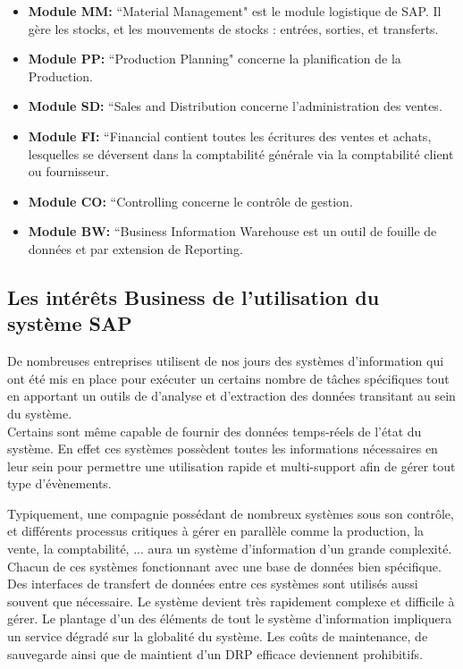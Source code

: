 \begin{itemize}
	\item \textbf{Module MM: }``Material Management" est le module logistique de SAP. Il gère les stocks, et les mouvements de stocks : entrées, sorties, et transferts.
	
	\item \textbf{Module PP: }``Production Planning" concerne la planification de la Production.
	
	 \item \textbf{Module SD: }``Sales and Distribution concerne l'administration des ventes.
	 
	 \item \textbf{Module FI: }``Financial contient toutes les écritures des ventes et achats, lesquelles se déversent dans la comptabilité générale via la comptabilité client ou fournisseur.
	 
	 \item \textbf{Module CO: }``Controlling concerne le contrôle de gestion.
	 
	 \item \textbf{Module BW: }``Business Information Warehouse est un outil de fouille de données et par extension de Reporting.
	 
\end{itemize} 

\clearpage

\subsection{Les intérêts Business de l'utilisation du système SAP}

De nombreuses entreprises utilisent de nos jours des systèmes d'information qui ont été mis en place pour exécuter un certains nombre de tâches spécifiques tout en apportant un outils de d'analyse et d'extraction des données transitant au sein du système.\\
Certains sont même capable de fournir des données temps-réels de l'état du système. En effet ces systèmes possèdent toutes les informations nécessaires en leur sein pour permettre une utilisation rapide et multi-support afin de gérer tout type d'évènements. 

Typiquement, une compagnie possédant de nombreux systèmes sous son contrôle, et différents processus critiques à gérer en parallèle comme la production, la vente, la comptabilité, ... aura un système d'information d'un grande complexité.  Chacun de ces systèmes fonctionnant avec une base de données bien spécifique. \\
Des interfaces de transfert de données entre ces systèmes sont utilisés aussi souvent que nécessaire. Le système devient très rapidement complexe et difficile à gérer. Le plantage d'un des éléments de tout le système d'information impliquera un service dégradé sur la globalité du système. Les coûts de maintenance, de sauvegarde ainsi que de maintient d'un DRP efficace deviennent prohibitifs.

